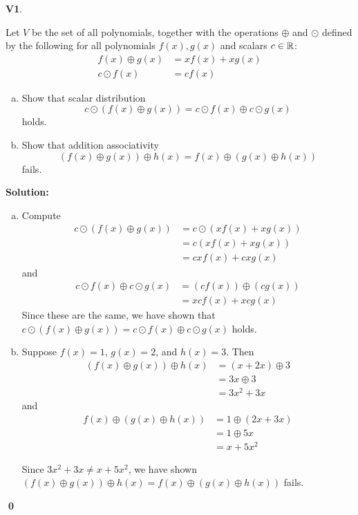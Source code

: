 \documentclass{article}
\newenvironment{problem}[1]
{
  \begin{flushleft}
  \textbf{#1}.
  \ignorespaces
}
{
  \end{flushleft}
}
\newenvironment{solution}
{
  \ignorespaces
  \textbf{Solution:}
}
{
  \ignorespacesafterend
  \begin{flushright}
  {\bfseries \qed}
  \end{flushright}
}
\begin{document}
\begin{problem}{V1}
Let \(V\) be the set of all polynomials, together with the operations
\(\oplus\) and \(\odot\) defined by the following for all polynomials
\(f(x),g(x)\) and scalars \(c \in \mathbb{R}\):
\begin{align*}
f(x) \oplus g(x) &= xf(x)+xg(x) \\
c\odot f(x) &= cf(x)
\end{align*}
\begin{enumerate}[(a)]
\item Show that scalar distribution
\[c\odot \left(f(x)\oplus g(x) \right) = c \odot f(x) \oplus c \odot g(x)\]
holds.
\item Show that addition associativity
\[
  \left( f(x) \oplus g(x) \right) \oplus h(x)
=
  f(x) \oplus \left( g(x) \oplus h(x) \right)
\]
fails.
\end{enumerate}
\end{problem}
\begin{solution}
\begin{enumerate}[(a)]
\item
Compute
\begin{align*}
  c \odot \left(f(x) \oplus g(x) \right)
  &= c \odot \left(xf(x)+xg(x)\right) \\
  &= c\left(xf(x)+xg(x) \right) \\
  &= cxf(x)+cxg(x)
\end{align*}
and
\begin{align*}
  c\odot f(x) \oplus c \odot g(x)
  &= (cf(x)) \oplus (cg(x))\\
  &= xcf(x)+xcg(x)
\end{align*}
Since these are the same, we have shown that
\(c\odot \left(f(x)\oplus g(x) \right) = c \odot f(x) \oplus c \odot g(x)\)
holds.
\item
Suppose \(f(x)=1\), \(g(x)=2\), and \(h(x)=3\). Then
\begin{align*}
  \left( f(x) \oplus g(x) \right) \oplus h(x)
  &=\left(x+2x \right) \oplus 3\\
  &=3x \oplus 3\\
  &= 3x^2+3x
\end{align*}
and
\begin{align*}
  f(x) \oplus \left( g(x) \oplus h(x) \right)
  &=1 \oplus \left(2x+3x\right) \\
  &=1 \oplus 5x \\
  &=x + 5x^2
\end{align*}


Since \(3x^2+3x\not=x+5x^2\), we have shown
\(
  \left( f(x) \oplus g(x) \right) \oplus h(x)
=
  f(x) \oplus \left( g(x) \oplus h(x) \right)
\)
fails.
\end{enumerate}
\end{solution}
\end{document}
